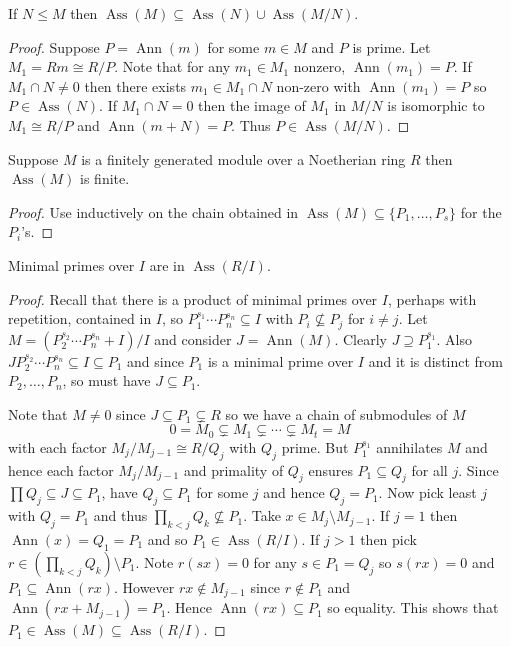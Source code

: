 \documentclass[a4paper]{article}
\DeclareMathOperator{\Ann}{Ann} %
\DeclareMathOperator{\Ass}{Ass} %
\begin{document}
\begin{lemma}
  \label{lem:associated prime of sub and quotient}
  If \(N \leq M\) then \(\Ass(M) \subseteq \Ass(N) \cup \Ass(M/N)\).
\end{lemma}

\begin{proof}
  Suppose \(P = \Ann(m)\) for some \(m \in M\) and \(P\) is prime. Let \(M_1 = Rm \cong R/P\). Note that for any \(m_1 \in M_1\) nonzero, \(\Ann(m_1) = P\). If \(M_1 \cap N \neq 0\) then there exists \(m_1 \in M_1 \cap N\) non-zero with \(\Ann(m_1) = P\) so \(P \in \Ass(N)\). If \(M_1 \cap N = 0\) then the image of \(M_1\) in \(M/N\) is isomorphic to \(M_1 \cong R/P\) and \(\Ann(m + N) = P\). Thus \(P \in \Ass(M/N)\).
\end{proof}

\begin{lemma}
  Suppose \(M\) is a finitely generated module over a Noetherian ring \(R\) then \(\Ass(M)\) is finite.
\end{lemma}

\begin{proof}
  Use  inductively on the chain obtained in  \(\Ass(M) \subseteq \{P_1, \dots, P_s\}\) for the \(P_i\)'s.
\end{proof}

\begin{lemma}
  Minimal primes over \(I\) are in \(\Ass(R/I)\).
\end{lemma}

\begin{proof}
  Recall that there is a product of minimal primes over \(I\), perhaps with repetition, contained in \(I\), so \(P_1^{s_1} \cdots P_n^{s_n} \subseteq I\) with \(P_i \nsubseteq P_j\) for \(i \neq j\). Let \(M = (P_2^{s_2} \cdots P_n^{s_n} + I)/I\) and consider \(J = \Ann(M)\). Clearly \(J \supseteq P_1^{s_1}\). Also \(JP_2^{s_2} \cdots P_n^{s_n} \subseteq I \subseteq P_1\) and since \(P_1\) is a minimal prime over \(I\) and it is distinct from \(P_2, \dots, P_n\), so must have \(J \subseteq P_1\).

  Note that \(M \neq 0\) since \(J \subseteq P_1 \subsetneq R\) so we have a chain of submodules of \(M\)
  \[
    0 = M_0 \subsetneq M_1 \subsetneq \cdots \subsetneq M_t = M
  \]
  with each factor \(M_j/M_{j - 1} \cong R/Q_j\) with \(Q_j\) prime. But \(P_1^{s_1}\) annihilates \(M\) and hence each factor \(M_j/M_{j - 1}\) and primality of \(Q_j\) ensures \(P_1 \subseteq Q_j\) for all \(j\). Since \(\prod Q_j \subseteq J \subseteq P_1\), have \(Q_j \subseteq P_1\) for some \(j\) and hence \(Q_j = P_1\). Now pick least \(j\) with \(Q_j = P_1\) and thus \(\prod_{k < j} Q_k \nsubseteq P_1\). Take \(x \in M_j \setminus M_{j - 1}\). If \(j = 1\) then \(\Ann(x) = Q_1 = P_1\) and so \(P_1 \in \Ass(R/I)\). If \(j > 1\) then pick \(r \in (\prod_{k < j} Q_k) \setminus P_1\). Note \(r(sx) = 0\) for any \(s \in P_1 = Q_j\) so \(s(rx) = 0\) and \(P_1 \subseteq \Ann(rx)\). However \(rx \notin M_{j - 1}\) since \(r \notin P_1\) and \(\Ann(rx + M_{j - 1}) = P_1\). Hence \(\Ann(rx) \subseteq P_1\) so equality. This shows that \(P_1 \in \Ass(M) \subseteq \Ass(R/I)\).
\end{proof}
\end{document}
